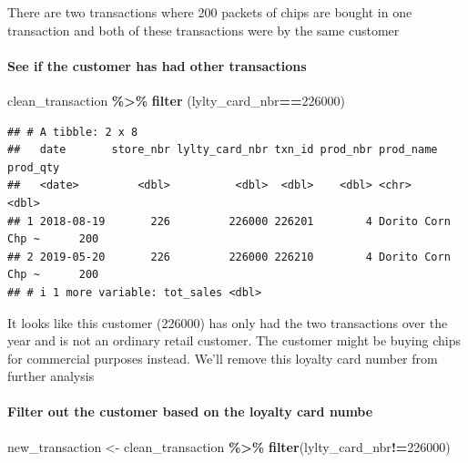 \documentclass[
]{article}
\newenvironment{Shaded}{\begin{snugshade}}{\end{snugshade}}
\newcommand{\DecValTok}[1]{\textcolor[rgb]{0.00,0.00,0.81}{#1}}
\newcommand{\FunctionTok}[1]{\textcolor[rgb]{0.13,0.29,0.53}{\textbf{#1}}}
\newcommand{\NormalTok}[1]{#1}
\newcommand{\OtherTok}[1]{\textcolor[rgb]{0.56,0.35,0.01}{#1}}
\newcommand{\SpecialCharTok}[1]{\textcolor[rgb]{0.81,0.36,0.00}{\textbf{#1}}}
\begin{document}
There are two transactions where 200 packets of chips are bought in one
transaction and both of these transactions were by the same customer

\hypertarget{see-if-the-customer-has-had-other-transactions}{%
\paragraph{See if the customer has had other
transactions}\label{see-if-the-customer-has-had-other-transactions}}

\begin{Shaded}
\begin{Highlighting}[]
\NormalTok{clean\_transaction }\SpecialCharTok{\%\textgreater{}\%} \FunctionTok{filter}\NormalTok{ (lylty\_card\_nbr}\SpecialCharTok{==}\DecValTok{226000}\NormalTok{)}
\end{Highlighting}
\end{Shaded}

\begin{verbatim}
## # A tibble: 2 x 8
##   date       store_nbr lylty_card_nbr txn_id prod_nbr prod_name         prod_qty
##   <date>         <dbl>          <dbl>  <dbl>    <dbl> <chr>                <dbl>
## 1 2018-08-19       226         226000 226201        4 Dorito Corn Chp ~      200
## 2 2019-05-20       226         226000 226210        4 Dorito Corn Chp ~      200
## # i 1 more variable: tot_sales <dbl>
\end{verbatim}

It looks like this customer (226000) has only had the two transactions
over the year and is not an ordinary retail customer. The customer might
be buying chips for commercial purposes instead. We'll remove this
loyalty card number from further analysis

\hypertarget{filter-out-the-customer-based-on-the-loyalty-card-numbe}{%
\paragraph{Filter out the customer based on the loyalty card
numbe}\label{filter-out-the-customer-based-on-the-loyalty-card-numbe}}

\begin{Shaded}
\begin{Highlighting}[]
\NormalTok{new\_transaction }\OtherTok{\textless{}{-}}\NormalTok{ clean\_transaction }\SpecialCharTok{\%\textgreater{}\%} \FunctionTok{filter}\NormalTok{(lylty\_card\_nbr}\SpecialCharTok{!=}\DecValTok{226000}\NormalTok{)}
\end{Highlighting}
\end{Shaded}
\end{document}
